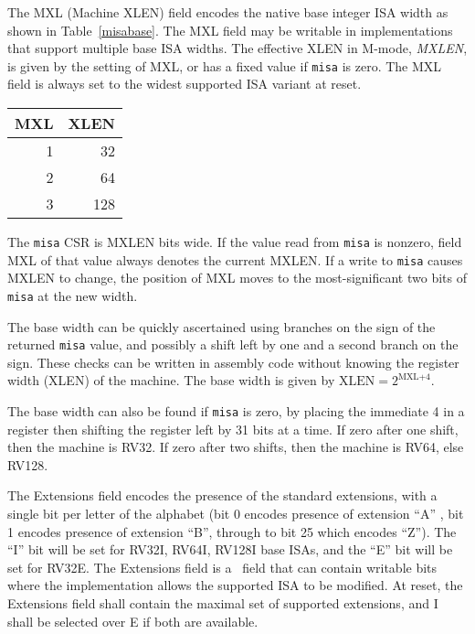 The MXL (Machine XLEN) field encodes the native base integer ISA width
as shown in Table~\ref{misabase}.  The MXL field may be writable in
implementations that support multiple base ISA widths.  The effective
XLEN in M-mode, {\em MXLEN}, is given by the setting of MXL, or has a
fixed value if {\tt misa} is zero.  The MXL field is always set to the
widest supported ISA variant at reset.

\begin{table*}[h!]
\begin{center}
\begin{tabular}{|r|r|}
\hline
MXL  & XLEN \\
\hline	 
1   & 32 \\
2   & 64 \\
3   & 128 \\
\hline
\end{tabular}
\end{center}
\caption{Encoding of MXL field in {\tt misa}}
\label{misabase}
\end{table*}

The {\tt misa} CSR is MXLEN bits wide.  If the value read from {\tt misa} is
nonzero, field MXL of that value always denotes the current MXLEN. If a write
to {\tt misa} causes MXLEN to change, the position of MXL moves to the
most-significant two bits of {\tt misa} at the new width.

\begin{commentary}
The base width can be quickly ascertained using branches on the sign
of the returned {\tt misa} value, and possibly a shift left by one and
a second branch on the sign.  These checks can be written in assembly
code without knowing the register width (XLEN) of the machine.  The
base width is given by $\mbox{XLEN}=2^{\mbox{MXL+4}}$.

The base width can also be found if {\tt misa} is zero, by placing the
immediate 4 in a register then shifting the register left by 31 bits
at a time.  If zero after one shift, then the machine is RV32.  If
zero after two shifts, then the machine is RV64, else RV128.
\end{commentary}

The Extensions field encodes the presence of the standard extensions,
with a single bit per letter of the alphabet (bit 0 encodes presence
of extension ``A'' , bit 1 encodes presence of extension ``B'',
through to bit 25 which encodes ``Z'').  The ``I'' bit will be set for
RV32I, RV64I, RV128I base ISAs, and the ``E'' bit will be set for
RV32E.  The Extensions field is a \warl\ field that can contain writable bits
where the implementation allows the supported ISA to be modified.  At
reset, the Extensions field shall contain the maximal set of supported
extensions, and I shall be selected over E if both are available.

